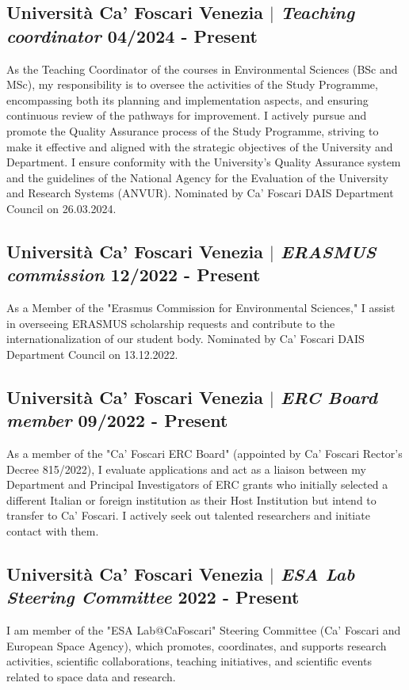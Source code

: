 \documentclass[11pt]{article}
\begin{document}
\subsection{Università Ca' Foscari Venezia  $|$ {\normalfont\textit{Teaching coordinator}} \hfill 04/2024 - Present}
{\footnotesize As the Teaching Coordinator of the courses in Environmental Sciences (BSc and MSc), my responsibility is to oversee the activities of the Study Programme, encompassing both its planning and implementation aspects, and ensuring continuous review of the pathways for improvement. I actively pursue and promote the Quality Assurance process of the Study Programme, striving to make it effective and aligned with the strategic objectives of the University and Department. I ensure conformity with the University's Quality Assurance system and the guidelines of the National Agency for the Evaluation of the University and Research Systems (ANVUR). Nominated by Ca' Foscari DAIS Department Council on 26.03.2024.}
\bigskip

\subsection{Università Ca' Foscari Venezia  $|$ {\normalfont\textit{ERASMUS commission}} \hfill 12/2022 - Present}
{\footnotesize As a Member of the "Erasmus Commission for Environmental Sciences," I assist in overseeing ERASMUS scholarship requests and contribute to the internationalization of our student body. Nominated by Ca' Foscari DAIS Department Council on 13.12.2022.}
\bigskip

\subsection{Università Ca' Foscari Venezia  $|$ {\normalfont\textit{ERC Board member}} \hfill 09/2022 - Present}
{\footnotesize As a member of the "Ca' Foscari ERC Board" (appointed by Ca' Foscari Rector’s Decree 815/2022), I evaluate applications and act as a liaison between my Department and Principal Investigators of ERC grants who initially selected a different Italian or foreign institution as their Host Institution but intend to transfer to Ca' Foscari. I actively seek out talented researchers and initiate contact with them.}
\bigskip

\subsection{Università Ca' Foscari Venezia  $|$ {\normalfont\textit{ESA Lab Steering Committee}} \hfill 2022 - Present}
{\footnotesize I am member of the "ESA Lab@CaFoscari" Steering Committee (Ca' Foscari and European Space Agency), which promotes, coordinates, and supports research activities, scientific collaborations, teaching initiatives, and scientific events related to space data and research.}
\bigskip
\end{document}
